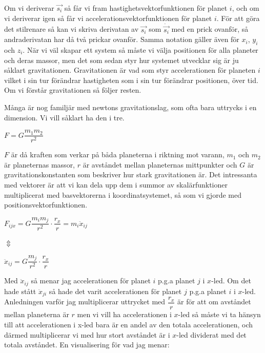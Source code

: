 \documentclass[10pt, a4paper]{amsart}
\begin{document}
Om vi deriverar $ \vec{s_i} $ så får vi fram hastighetsvektorfunktionen för planet $ i $, 
och om vi deriverar igen så får vi accelerationsvektorfunktionen för planet $ i $. 
För att göra det stilrenare så kan vi skriva derivatan av $ \vec{s_i} $ som $ \dot \vec{s_i} $ med en prick ovanför, 
så andraderivatan har då två prickar ovanför. Samma notation gäller även för $ x_i $, $ y_i $ och $ z_i $.
När vi väl skapar ett system så måste vi välja positionen för alla planeter och deras massor, 
men det som sedan styr hur systemet utvecklar sig är ju såklart gravitationen. 
Gravitationen är vad som styr accelerationen för planeten $ i $ vilket i sin tur förändrar hastigheten som i sin tur förändrar positionen, över tid. 
Om vi förstår gravitationen så följer resten.
\bigskip

Många är nog familjär med newtons gravitationslag, som ofta bara uttrycks i en dimension. Vi vill såklart ha den i tre.
\bigskip

\bigskip
\hspace{5ex}
$ F = G\dfrac{m_1m_2}{r^2} $ 
\bigskip
\bigskip

$ F $ är då kraften som verkar på båda planeterna i riktning mot varann, 
$ m_1 $ och $ m_2 $ är planeternas massor, 
$ r $ är avståndet mellan planeternas mittpunkter och $ G $ är gravitationskonstanten som beskriver hur stark gravitationen är. 
Det intressanta med vektorer är att vi kan dela upp dem i summor av skalärfunktioner multiplicerat med basvektorerna i koordinatsystemet, 
så som vi gjorde med positionsvektorfunktionen.
\bigskip

\bigskip
\hspace{5ex}
$ F_{ijx} = G\dfrac{m_im_j}{r^2} \cdot \dfrac{r_x}{r} = m_i \ddot x_{ij} $ 
\bigskip

\hspace{10ex}
$ \Updownarrow $
\bigskip

\hspace{5ex}
$ \ddot x_{ij} = G\dfrac{m_j}{r^2} \cdot \dfrac{r_x}{r} $
\bigskip

Med $ \ddot x_{ij} $ så menar jag accelerationen för planet $ i $ p.g.a planet $ j $ i $ x $-led. 
Om det hade stått $ \ddot x_{ji} $ så hade det varit accelerationen för planet $ j $ p.g.a planet $ i $ i $ x $-led.
Anledningen varför jag multiplicerar uttrycket med $ \dfrac{r_x}{r} $ är för att om avståndet mellan planeterna är $ r $ men vi vill ha accelerationen i $ x $-led så måste vi ta hänsyn till att accelerationen i x-led bara är en andel av den totala accelerationen,
och därmed multiplicerar vi med hur stort avståndet är i $ x $-led dividerat med det totala avståndet. En visualisering för vad jag menar:
\bigskip
\end{document}
